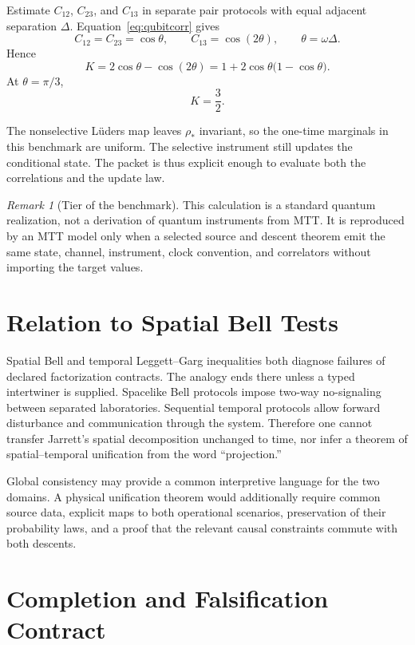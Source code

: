 \documentclass[11pt]{article}
\theoremstyle{definition}
\theoremstyle{remark}
\newtheorem{remark}{Remark}
\begin{document}
Estimate $C_{12}$, $C_{23}$, and $C_{13}$ in separate pair protocols with
equal adjacent separation $\Delta$.  Equation~\eqref{eq:qubitcorr} gives
\[
C_{12}=C_{23}=\cos\theta,\qquad
C_{13}=\cos(2\theta),\qquad
\theta=\omega\Delta.
\]
Hence
\[
K=2\cos\theta-\cos(2\theta)
=1+2\cos\theta\bigl(1-\cos\theta\bigr).
\]
At $\theta=\pi/3$,
\[
K=\frac32.
\]

The nonselective L\"uders map leaves $\rho_\ast$ invariant, so the one-time
marginals in this benchmark are uniform.  The selective instrument still
updates the conditional state.  The packet is thus explicit enough to
evaluate both the correlations and the update law.

\begin{remark}[Tier of the benchmark]
This calculation is a standard quantum realization, not a derivation of
quantum instruments from MTT.  It is reproduced by an MTT model only when a
selected source and descent theorem emit the same state, channel, instrument,
clock convention, and correlators without importing the target values.
\end{remark}

\section{Relation to Spatial Bell Tests}

Spatial Bell and temporal Leggett--Garg inequalities both diagnose failures
of declared factorization contracts.  The analogy ends there unless a typed
intertwiner is supplied.  Spacelike Bell protocols impose two-way
no-signaling between separated laboratories.  Sequential temporal protocols
allow forward disturbance and communication through the system.  Therefore
one cannot transfer Jarrett's spatial decomposition unchanged to time, nor
infer a theorem of spatial--temporal unification from the word
``projection.''

Global consistency may provide a common interpretive language for the two
domains.  A physical unification theorem would additionally require common
source data, explicit maps to both operational scenarios, preservation of
their probability laws, and a proof that the relevant causal constraints
commute with both descents.

\section{Completion and Falsification Contract}
\end{document}
